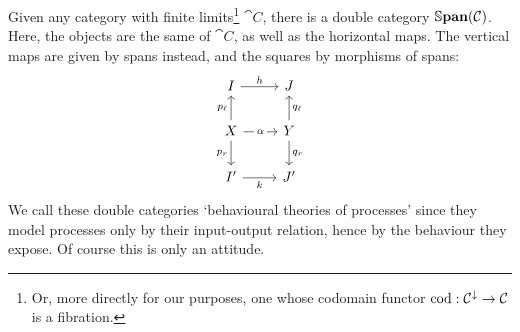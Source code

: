 \begin{example}
\label{ex:behav-processes}
	Given any category with finite limits\footnote{Or, more directly for our purposes, one whose codomain functor $\cod:\cat C^\downarrow \to \cat C$ is a fibration.} $\cat C$, there is a double category $\Span(\cat C)$.
	Here, the objects are the same of $\cat C$, as well as the horizontal maps.
	The vertical maps are given by spans instead, and the squares by morphisms of spans:
	\begin{equation}
		\begin{tikzcd}[ampersand replacement=\&]
			I \& J \\
			X \& Y \\
			{I'} \& {J'}
			\arrow["{p_r}"', from=2-1, to=3-1]
			\arrow["{q_r}", from=2-2, to=3-2]
			\arrow["{p_\ell}", from=2-1, to=1-1]
			\arrow["{q_\ell}"', from=2-2, to=1-2]
			\arrow["\alpha"{description}, from=2-1, to=2-2]
			\arrow["k"', from=3-1, to=3-2]
			\arrow["h", from=1-1, to=1-2]
		\end{tikzcd}
	\end{equation}
	We call these double categories `behavioural theories of processes' since they model processes only by their input-output relation, hence by the behaviour they expose.
	Of course this is only an attitude.
\end{example}
